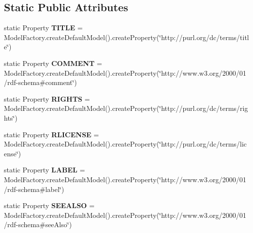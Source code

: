 \subsection*{Static Public Attributes}
\begin{DoxyCompactItemize}
\item 
\hypertarget{classodrlmodel_1_1_r_d_f_utils_a095ba20cefe97c59b99f5f62e5241e5d}{static Property {\bfseries T\-I\-T\-L\-E} = Model\-Factory.\-create\-Default\-Model().create\-Property(\char`\"{}http\-://purl.\-org/dc/terms/title\char`\"{})}\label{classodrlmodel_1_1_r_d_f_utils_a095ba20cefe97c59b99f5f62e5241e5d}

\item 
\hypertarget{classodrlmodel_1_1_r_d_f_utils_a6ec492c7244e1ba78dcdbc1a047fff1a}{static Property {\bfseries C\-O\-M\-M\-E\-N\-T} = Model\-Factory.\-create\-Default\-Model().create\-Property(\char`\"{}http\-://www.\-w3.\-org/2000/01/rdf-\/schema\#comment\char`\"{})}\label{classodrlmodel_1_1_r_d_f_utils_a6ec492c7244e1ba78dcdbc1a047fff1a}

\item 
\hypertarget{classodrlmodel_1_1_r_d_f_utils_a0db828183c882c2b564e0f6da42f1d5a}{static Property {\bfseries R\-I\-G\-H\-T\-S} = Model\-Factory.\-create\-Default\-Model().create\-Property(\char`\"{}http\-://purl.\-org/dc/terms/rights\char`\"{})}\label{classodrlmodel_1_1_r_d_f_utils_a0db828183c882c2b564e0f6da42f1d5a}

\item 
\hypertarget{classodrlmodel_1_1_r_d_f_utils_aa2275f5f68d0d27bf845393a3e7c2dd4}{static Property {\bfseries R\-L\-I\-C\-E\-N\-S\-E} = Model\-Factory.\-create\-Default\-Model().create\-Property(\char`\"{}http\-://purl.\-org/dc/terms/license\char`\"{})}\label{classodrlmodel_1_1_r_d_f_utils_aa2275f5f68d0d27bf845393a3e7c2dd4}

\item 
\hypertarget{classodrlmodel_1_1_r_d_f_utils_ae069861fdbfe8ab1b905dd2289fe07bb}{static Property {\bfseries L\-A\-B\-E\-L} = Model\-Factory.\-create\-Default\-Model().create\-Property(\char`\"{}http\-://www.\-w3.\-org/2000/01/rdf-\/schema\#label\char`\"{})}\label{classodrlmodel_1_1_r_d_f_utils_ae069861fdbfe8ab1b905dd2289fe07bb}

\item 
\hypertarget{classodrlmodel_1_1_r_d_f_utils_abed84ce9ab44adf6778df448352c9e09}{static Property {\bfseries S\-E\-E\-A\-L\-S\-O} = Model\-Factory.\-create\-Default\-Model().create\-Property(\char`\"{}http\-://www.\-w3.\-org/2000/01/rdf-\/schema\#see\-Also\char`\"{})}\label{classodrlmodel_1_1_r_d_f_utils_abed84ce9ab44adf6778df448352c9e09}


\end{DoxyCompactItemize}
